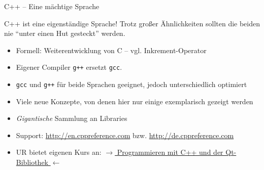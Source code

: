 
\begin{frame}[t,plain]
\titlepage
\end{frame}


\begin{frame}
%
%
\end{frame}


\begin{frame}{C++ -- Eine mächtige Sprache}
%
\begin{warnbox}
C++ ist eine eigenständige Sprache! Trotz großer Ähnlichkeiten sollten die beiden nie \enquote{unter einen Hut gesteckt} werden.
\end{warnbox}
%
\begin{itemize}
\item Formell: Weiterentwicklung von C -- vgl. Inkrement-Operator
\item Eigener Compiler \texttt{g++} ersetzt \texttt{gcc}.
\item \texttt{gcc} und \texttt{g++} für beide Sprachen geeignet, jedoch unterschiedlich optimiert
\item Viele neue Konzepte, von denen hier nur einige exemplarisch gezeigt werden
\item \emph{Gigantische} Sammlung an Libraries
\item Support: \url{http://en.cppreference.com} bzw. \url{http://de.cppreference.com}
\item UR bietet eigenen Kurs an:
	\href{http://www.physik.uni-regensburg.de/studium/it/c++kurs/}
	{$\rightarrow$ Programmieren mit C++ und der Qt-Bibliothek $\leftarrow$}
\end{itemize}
%
\end{frame}



